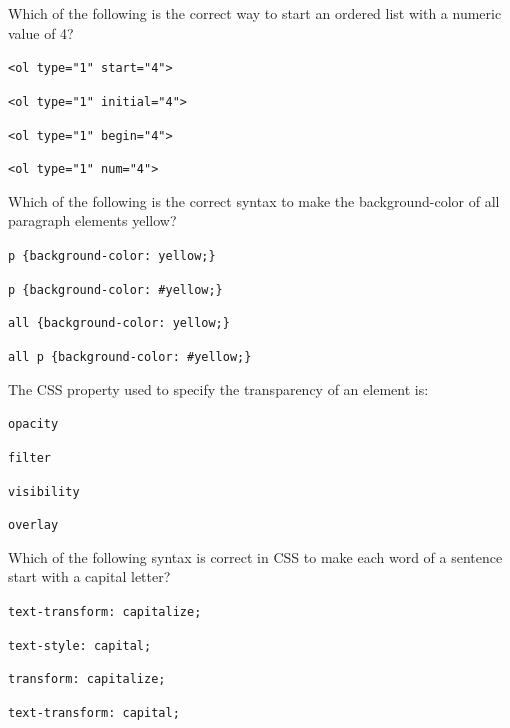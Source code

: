 \documentclass[11pt,a4paper]{article}
\begin{document}
\begin{parts}
  \item Which of the following is the correct way to start an ordered list with a numeric value of 4?
  
\begin{parts}
    \item   \texttt{<ol type="1" start="4">}
    \item   \texttt{<ol type="1" initial="4">}
    \item   \texttt{<ol type="1" begin="4">}
    \item   \texttt{<ol type="1" num="4">}
  \end{parts}

  \item Which of the following is the correct syntax to make the background-color of all paragraph elements yellow?
  
\begin{parts}
    \item   \texttt{p \{background-color: yellow;\}}
    \item   \texttt{p \{background-color: \#yellow;\}}
    \item   \texttt{all \{background-color: yellow;\}}
    \item   \texttt{all p \{background-color: \#yellow;\}}
  \end{parts}

  \item The CSS property used to specify the transparency of an element is:
  
\begin{parts}
    \item   \texttt{opacity}
    \item   \texttt{filter}
    \item   \texttt{visibility}
    \item   \texttt{overlay}
  \end{parts}

  \item Which of the following syntax is correct in CSS to make each word of a sentence start with a capital letter?
  
\begin{parts}
    \item   \texttt{text-transform: capitalize;}
    \item   \texttt{text-style: capital;}
    \item   \texttt{transform: capitalize;}
    \item   \texttt{text-transform: capital;}
  \end{parts}


\end{parts}
\end{document}
